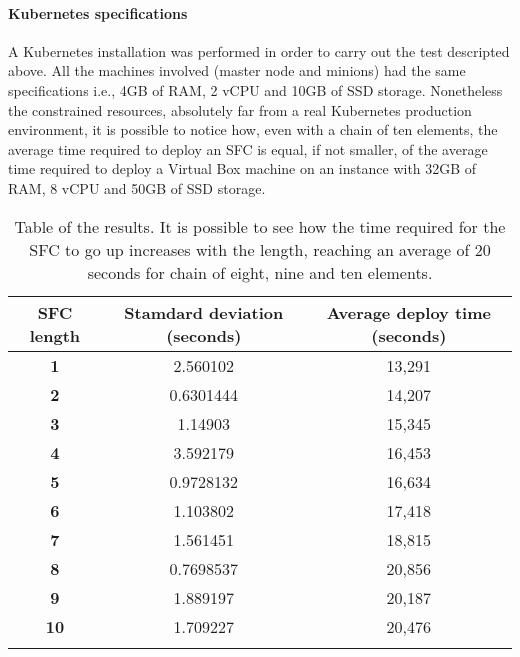 \paragraph*{Kubernetes specifications}
A Kubernetes installation was performed in order to carry out the test
descripted above. All the machines involved (master node and minions) had the
same specifications i.e., 4GB of RAM, 2 vCPU and 10GB of SSD storage.
Nonetheless the constrained resources, absolutely far from a real Kubernetes
production environment, it is possible to notice how, even with a chain of ten
elements, the average time required to deploy an SFC is equal, if not smaller,
of the average time required to deploy a Virtual Box machine on an instance 
with 32GB of RAM, 8 vCPU and 50GB of SSD storage.

\begin{longtable}[c]{c|c|c}
\textbf{SFC length} & \textbf{Stamdard deviation (seconds)} & \textbf{Average 
deploy time (seconds)} \\ \hline
\endhead
%
\textbf{1}          & 2.560102                   & 13,291                     \\
\textbf{2}          & 0.6301444                  & 14,207                     \\
\textbf{3}          & 1.14903                    & 15,345                     \\
\textbf{4}          & 3.592179                   & 16,453                     \\
\textbf{5}          & 0.9728132                  & 16,634                     \\
\textbf{6}          & 1.103802                   & 17,418                     \\
\textbf{7}          & 1.561451                   & 18,815                     \\
\textbf{8}          & 0.7698537                  & 20,856                     \\
\textbf{9}          & 1.889197                   & 20,187                     \\
\textbf{10}         & 1.709227                   & 20,476                     \\
\caption[SFC start up time]{Table of the results. It is possible to see how the
  time required for the SFC to go up increases with the length, reaching an
  average of 20 seconds for chain of eight, nine and ten elements.}
\label{chap:tests:sec:sfclength:tab:sfcdata}\\
\end{longtable}


